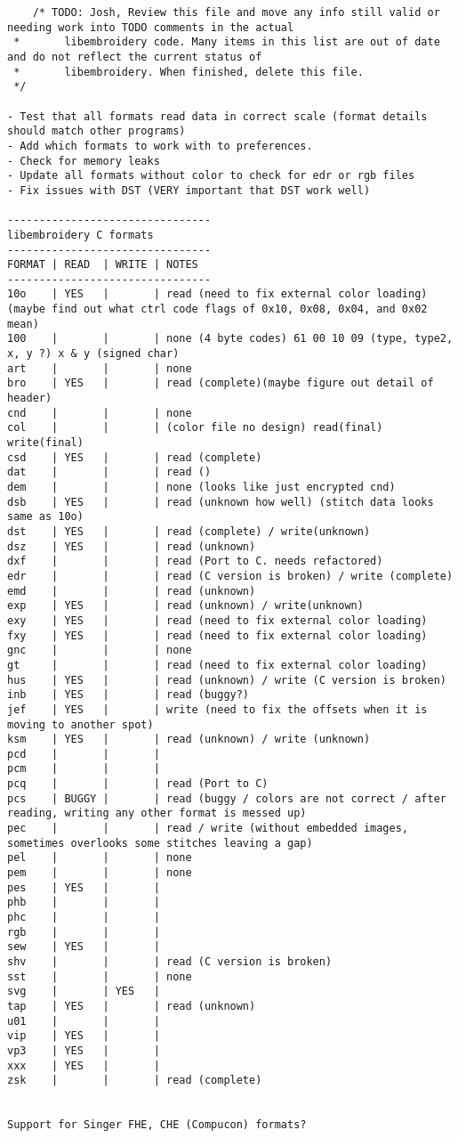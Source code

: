 \begin{verbatim}
    /* TODO: Josh, Review this file and move any info still valid or needing work into TODO comments in the actual
 *       libembroidery code. Many items in this list are out of date and do not reflect the current status of
 *       libembroidery. When finished, delete this file.
 */

- Test that all formats read data in correct scale (format details should match other programs)
- Add which formats to work with to preferences.
- Check for memory leaks
- Update all formats without color to check for edr or rgb files
- Fix issues with DST (VERY important that DST work well)

--------------------------------
libembroidery C formats
--------------------------------
FORMAT | READ  | WRITE | NOTES
--------------------------------
10o    | YES   |       | read (need to fix external color loading) (maybe find out what ctrl code flags of 0x10, 0x08, 0x04, and 0x02 mean)
100    |       |       | none (4 byte codes) 61 00 10 09 (type, type2, x, y ?) x & y (signed char)
art    |       |       | none
bro    | YES   |       | read (complete)(maybe figure out detail of header)
cnd    |       |       | none
col    |       |       | (color file no design) read(final) write(final)
csd    | YES   |       | read (complete)
dat    |       |       | read ()
dem    |       |       | none (looks like just encrypted cnd)
dsb    | YES   |       | read (unknown how well) (stitch data looks same as 10o)
dst    | YES   |       | read (complete) / write(unknown)
dsz    | YES   |       | read (unknown)
dxf    |       |       | read (Port to C. needs refactored)
edr    |       |       | read (C version is broken) / write (complete)
emd    |       |       | read (unknown)
exp    | YES   |       | read (unknown) / write(unknown)
exy    | YES   |       | read (need to fix external color loading)
fxy    | YES   |       | read (need to fix external color loading)
gnc    |       |       | none
gt     |       |       | read (need to fix external color loading)
hus    | YES   |       | read (unknown) / write (C version is broken)
inb    | YES   |       | read (buggy?)
jef    | YES   |       | write (need to fix the offsets when it is moving to another spot)
ksm    | YES   |       | read (unknown) / write (unknown)
pcd    |       |       | 
pcm    |       |       | 
pcq    |       |       | read (Port to C)
pcs    | BUGGY |       | read (buggy / colors are not correct / after reading, writing any other format is messed up)
pec    |       |       | read / write (without embedded images, sometimes overlooks some stitches leaving a gap)
pel    |       |       | none
pem    |       |       | none
pes    | YES   |       | 
phb    |       |       | 
phc    |       |       | 
rgb    |       |       | 
sew    | YES   |       | 
shv    |       |       | read (C version is broken)
sst    |       |       | none
svg    |       | YES   | 
tap    | YES   |       | read (unknown)
u01    |       |       | 
vip    | YES   |       | 
vp3    | YES   |       | 
xxx    | YES   |       | 
zsk    |       |       | read (complete)


Support for Singer FHE, CHE (Compucon) formats?
\end{verbatim}

